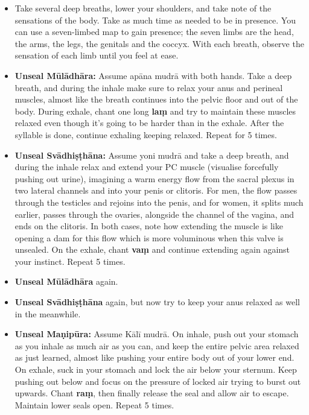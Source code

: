 \documentclass[a4paper,14pt]{memoir}
\newcommand{\mudra}{mudrā}
\newcommand{\Kali}{Kālī}
\newcommand{\apana}{apāna}
\newcommand{\muladhara}{Mūlādhāra}
\newcommand{\svadhisthana}{Svādhiṣṭhāna}
\newcommand{\manipura}{Maṇipūra}
\newcommand{\yoni}{yoni}
\begin{document}
\begin{itemize}
	\item Take several deep breaths, lower your shoulders, and take note of the sensations of the body. Take as much time as needed to be in presence. You can use a seven-limbed map to gain presence; the seven limbs are the head, the arms, the legs, the genitals and the coccyx. With each breath, observe the sensation of each limb until you feel at ease.
	\item \textbf{Unseal \muladhara{}:} Assume \apana{} \mudra{} with both hands. Take a deep breath, and during the inhale make sure to relax your anus and perineal muscles, almost like the breath continues into the pelvic floor and out of the body. During exhale, chant one long \textbf{laṃ} and try to maintain these muscles relaxed even though it's going to be harder than in the exhale. After the syllable is done, continue exhaling keeping relaxed. Repeat for 5 times.
	\item \textbf{Unseal \svadhisthana{}:} Assume \yoni{} \mudra{} and take a deep breath, and during the inhale relax and extend your PC muscle (visualise forcefully pushing out urine), imagining a warm energy flow from the sacral plexus in two lateral channels and into your penis or clitoris. For men, the flow passes through the testicles and rejoins into the penis, and for women, it splits much earlier, passes through the ovaries, alongside the channel of the vagina, and ends on the clitoris. In both cases, note how extending the muscle is like opening a dam for this flow which is more voluminous when this valve is unsealed. On the exhale, chant \textbf{vaṃ} and continue extending again against your instinct. Repeat 5 times.
	\item \textbf{Unseal \muladhara{}} again.
	\item \textbf{Unseal \svadhisthana{}} again, but now try to keep your anus relaxed as well in the meanwhile.
	\item \textbf{Unseal \manipura{}:} Assume \Kali{} \mudra{}. On inhale, push out your stomach as you inhale as much air as you can, and keep the entire pelvic area relaxed as just learned, almost like pushing your entire body out of your lower end. On exhale, suck in your stomach and lock the air below your sternum. Keep pushing out below and focus on the pressure of locked air trying to burst out upwards. Chant \textbf{raṃ}, then finally release the seal and allow air to escape. Maintain lower seals open. Repeat 5 times.
\end{itemize}
\end{document}

